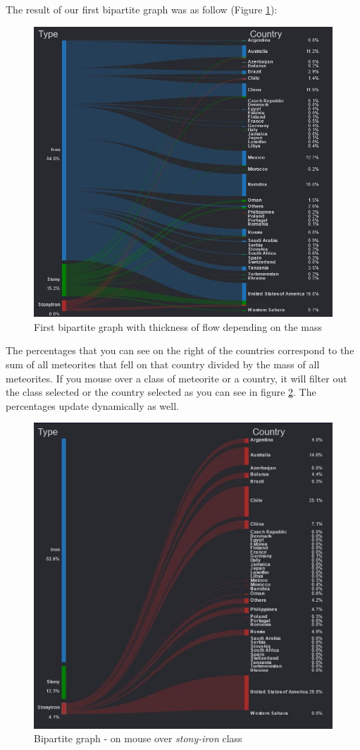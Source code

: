\documentclass[10pt,conference,compsocconf]{IEEEtran}
\begin{document}
The result of our first bipartite graph was as follow (Figure \ref{fig:bipartite_mass}):

\begin{figure}[]
  \centering
  \includegraphics[width=0.7\columnwidth]{images/bipartite_mass}
  \vspace{3mm}
  \caption{First bipartite graph with thickness of flow depending on the mass}
  \label{fig:bipartite_mass}
\end{figure}

The percentages that you can see on the right of the countries correspond to the sum of all meteorites that fell on that country divided by the mass of all meteorites. If you mouse over a class of meteorite or a country, it will filter out the class selected or the country selected as you can see in figure \ref{fig:bipartite_mouse}. The percentages update dynamically as well.

\begin{figure}[]
  \centering
  \includegraphics[width=0.7\columnwidth]{images/example_mouse_bipartite}
  \vspace{3mm}
  \caption{Bipartite graph - on mouse over \textit{stony-iron} class}
  \label{fig:bipartite_mouse}
\end{figure}
\end{document}
